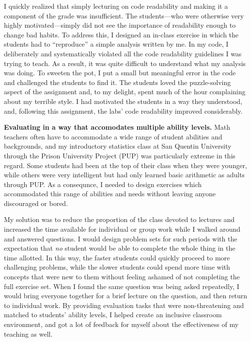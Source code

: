 I quickly realized that simply lecturing on code readability and making it a
component of the grade was insufficient.   The students---who were otherwise
very highly motivated---simply did not see the importance of readability
enough to change bad habits.  To address this, I designed an in-class exercise
in which the students had to ``reproduce'' a simple analysis written by me.  In
my code, I deliberately and systematically violated all the code readability
guidelines I was trying to teach.  As a result, it was quite difficult to
understand what my analysis was doing.  To sweeten the pot, I put a small but
meaningful error in the code and challenged the students to find it.  The
students loved the puzzle-solving aspect of the assignment and, to my delight,
spent much of the hour complaining about my terrible style.  I had motivated the
students in a way they understood, and, following this assignment, the labs'
code readability improved considerably.

\textbf{Evaluating in a way that accomodates multiple ability levels.}
Math teachers often have to accommodate a wide range of student abilities and
backgrounds, and my introductory statistics class at San Quentin University
through the Prison University Project (PUP) was particularly extreme in this
regard.  Some students had been at the top of their class when they were
younger, while others were very intelligent but had only learned basic
arithmetic as adults through PUP.  As a consequnce, I needed to design exercises
which accommodated this range of abilities and needs without leaving anyone
discouraged or bored.

My solution was to reduce the proportion of the class devoted to lectures and
increased the time available for individual or group work while I walked around
and answered questions.  I would design problem sets for such periods with the
expectation that \emph{no} student would be able to complete the whole thing in
the time allotted. In this way, the faster students could quickly proceed to
more challenging problems, while the slower students could spend more time with
concepts that were new to them without feeling ashamed of not completing the
full exercise set. When I found the same question was being asked repeatedly, I
would bring everyone together for a brief lecture on the question, and then
return to individual work.  By providing evaluation tasks that were
non-threatening and matched to students' ability levels, I helped create an
inclusive classroom environment, and got a lot of feedback for myself about the
effectiveness of my teaching as well.

